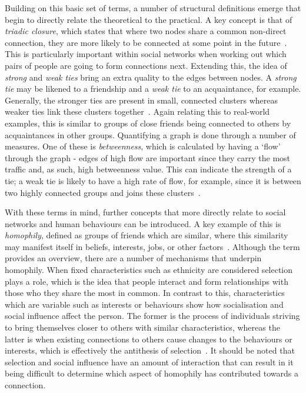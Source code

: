 \documentclass[]{report}
\begin{document}
Building on this basic set of terms, a number of structural definitions emerge that begin to directly relate the theoretical to the practical. A key concept is that of \emph{triadic closure}, which states that where two nodes share a common non-direct connection, they are more likely to be connected at some point in the future~\cite{NetMark-44}. This is particularly important within social networks when working out which pairs of people are going to form connections next. Extending this, the idea of \emph{strong} and \emph{weak ties} bring an extra quality to the edges between nodes. A \emph{strong tie} may be likened to a friendship and a \emph{weak tie} to an acquaintance, for example. Generally, the stronger ties are present in small, connected clusters whereas weaker ties link these clusters together~\cite{NetMark-46}. Again relating this to real-world examples, this is similar to groups of close friends being connected to others by acquaintances in other groups. Quantifying a graph is done through a number of measures. One of these is \emph{betweenness}, which is calculated by having a `flow' through the graph - edges of high flow are important since they carry the most traffic and, as such, high betweenness value. This can indicate the strength of a tie; a weak tie is likely to have a high rate of flow, for example, since it is between two highly connected groups and joins these clusters~\cite{NetMark-66}.  

With these terms in mind, further concepts that more directly relate to social networks and human behaviours can be introduced. A key example of this is \emph{homophily}, defined as groups of friends which are similar, where this similarity may manifest itself in beliefs, interests, jobs, or other factors~\cite{USN-18}. Although the term provides an overview, there are a number of mechanisms that underpin homophily. When fixed characteristics such as ethnicity are considered selection plays a role, which is the idea that people interact and form relationships with those who they share the most in common. In contrast to this, characteristics which are variable such as interests or behaviours show how socialisation and social influence affect the person. The former is the process of individuals striving to bring themselves closer to others with similar characteristics, whereas the latter is when existing connections to others cause changes to the behaviours or interests, which is effectively the antithesis of selection~\cite{NetMark-81}. It should be noted that selection and social influence have an amount of interaction that can result in it being difficult to determine which aspect of homophily has contributed towards a connection.
\end{document}
